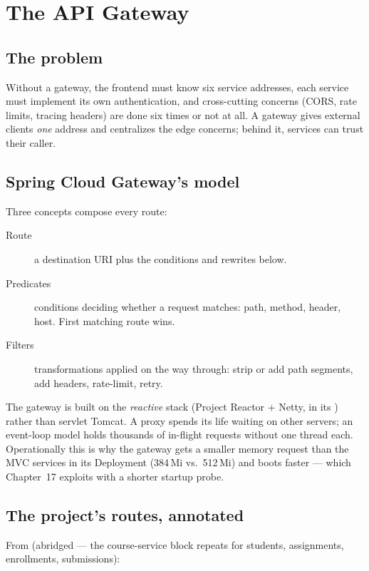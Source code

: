 \chapter{The API Gateway}
\label{ch:gateway}

\section{The problem}

Without a gateway, the frontend must know six service addresses, each
service must implement its own authentication, and cross-cutting concerns
(CORS, rate limits, tracing headers) are done six times or not at all. A
gateway gives external clients \emph{one} address and centralizes the
edge concerns; behind it, services can trust their caller.

\section{Spring Cloud Gateway's model}

Three concepts compose every route:

\begin{description}
  \item[Route] a destination URI plus the conditions and rewrites below.
  \item[Predicates] conditions deciding whether a request matches:
  path, method, header, host. First matching route wins.
  \item[Filters] transformations applied on the way through:
  strip or add path segments, add headers, rate-limit, retry.
\end{description}

The gateway is built on the \emph{reactive} stack (Project Reactor +
Netty,  in its
) rather than servlet Tomcat. A proxy spends its
life waiting on other servers; an event-loop model holds thousands of
in-flight requests without one thread each. Operationally this is why
the gateway gets a smaller memory request than the MVC services in its
Deployment (384\,Mi vs.\ 512\,Mi) and boots faster --- which
Chapter~17 exploits with a shorter startup probe.

\section{The project's routes, annotated}

From  (abridged --- the
course-service block repeats for students, assignments, enrollments,
submissions):


